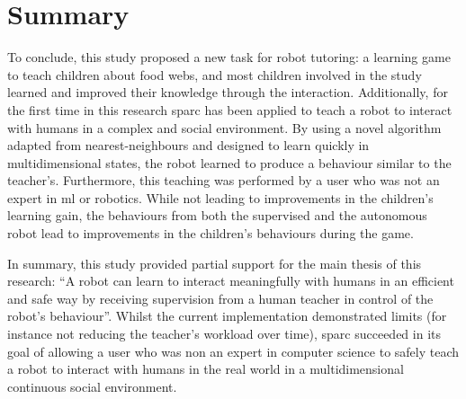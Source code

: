 


\section{Summary}

To conclude, this study proposed a new task for robot tutoring: a learning game to teach children about food webs, and most children involved in the study learned and improved their knowledge through the interaction. Additionally, for the first time in this research \gls{sparc} has been applied to teach a robot to interact with humans in a complex and social environment. By using a novel algorithm adapted from nearest-neighbours and designed to learn quickly in multidimensional states, the robot learned to produce a behaviour similar to the teacher's. Furthermore, this teaching was performed by a user who was not an expert in \gls{ml} or robotics. While not leading to improvements in the children's learning gain, the behaviours from both the supervised and the autonomous robot lead to improvements in the children's behaviours during the game. 

In summary, this study provided partial support for the main thesis of this research: ``A robot can learn to interact meaningfully with humans in an efficient and safe way by receiving supervision from a human teacher in control of the robot's behaviour''. Whilst the current implementation demonstrated limits (for instance not reducing the teacher's workload over time), \gls{sparc} succeeded in its goal of allowing a user who was non an expert in computer science to safely teach a robot to interact with humans in the real world in a multidimensional continuous social environment. 